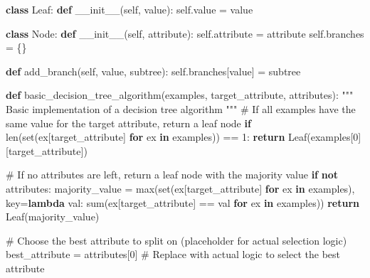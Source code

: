 \documentclass[
  letterpaper,
  DIV=11,
  numbers=noendperiod]{scrreprt}
\newenvironment{Shaded}{\begin{snugshade}}{\end{snugshade}}
\newcommand{\BuiltInTok}[1]{\textcolor[rgb]{0.00,0.23,0.31}{#1}}
\newcommand{\CommentTok}[1]{\textcolor[rgb]{0.37,0.37,0.37}{#1}}
\newcommand{\ControlFlowTok}[1]{\textcolor[rgb]{0.00,0.23,0.31}{\textbf{#1}}}
\newcommand{\DecValTok}[1]{\textcolor[rgb]{0.68,0.00,0.00}{#1}}
\newcommand{\FunctionTok}[1]{\textcolor[rgb]{0.28,0.35,0.67}{#1}}
\newcommand{\KeywordTok}[1]{\textcolor[rgb]{0.00,0.23,0.31}{\textbf{#1}}}
\newcommand{\NormalTok}[1]{\textcolor[rgb]{0.00,0.23,0.31}{#1}}
\newcommand{\OperatorTok}[1]{\textcolor[rgb]{0.37,0.37,0.37}{#1}}
\newcommand{\VariableTok}[1]{\textcolor[rgb]{0.07,0.07,0.07}{#1}}
\begin{document}
\begin{Shaded}
\begin{Highlighting}[]
\KeywordTok{class}\NormalTok{ Leaf:}
    \KeywordTok{def} \FunctionTok{\_\_init\_\_}\NormalTok{(}\VariableTok{self}\NormalTok{, value):}
        \VariableTok{self}\NormalTok{.value }\OperatorTok{=}\NormalTok{ value}

\KeywordTok{class}\NormalTok{ Node:}
    \KeywordTok{def} \FunctionTok{\_\_init\_\_}\NormalTok{(}\VariableTok{self}\NormalTok{, attribute):}
        \VariableTok{self}\NormalTok{.attribute }\OperatorTok{=}\NormalTok{ attribute}
        \VariableTok{self}\NormalTok{.branches }\OperatorTok{=}\NormalTok{ \{\}}

    \KeywordTok{def}\NormalTok{ add\_branch(}\VariableTok{self}\NormalTok{, value, subtree):}
        \VariableTok{self}\NormalTok{.branches[value] }\OperatorTok{=}\NormalTok{ subtree}

\KeywordTok{def}\NormalTok{ basic\_decision\_tree\_algorithm(examples, target\_attribute, attributes):}
    \CommentTok{"""}
\CommentTok{    Basic implementation of a decision tree algorithm}
\CommentTok{    """}
    \CommentTok{\# If all examples have the same value for the target attribute, return a leaf node}
    \ControlFlowTok{if} \BuiltInTok{len}\NormalTok{(}\BuiltInTok{set}\NormalTok{(ex[target\_attribute] }\ControlFlowTok{for}\NormalTok{ ex }\KeywordTok{in}\NormalTok{ examples)) }\OperatorTok{==} \DecValTok{1}\NormalTok{:}
        \ControlFlowTok{return}\NormalTok{ Leaf(examples[}\DecValTok{0}\NormalTok{][target\_attribute])}
    
    \CommentTok{\# If no attributes are left, return a leaf node with the majority value}
    \ControlFlowTok{if} \KeywordTok{not}\NormalTok{ attributes:}
\NormalTok{        majority\_value }\OperatorTok{=} \BuiltInTok{max}\NormalTok{(}\BuiltInTok{set}\NormalTok{(ex[target\_attribute] }\ControlFlowTok{for}\NormalTok{ ex }\KeywordTok{in}\NormalTok{ examples), key}\OperatorTok{=}\KeywordTok{lambda}\NormalTok{ val: }\BuiltInTok{sum}\NormalTok{(ex[target\_attribute] }\OperatorTok{==}\NormalTok{ val }\ControlFlowTok{for}\NormalTok{ ex }\KeywordTok{in}\NormalTok{ examples))}
        \ControlFlowTok{return}\NormalTok{ Leaf(majority\_value)}
    
    \CommentTok{\# Choose the best attribute to split on (placeholder for actual selection logic)}
\NormalTok{    best\_attribute }\OperatorTok{=}\NormalTok{ attributes[}\DecValTok{0}\NormalTok{]  }\CommentTok{\# Replace with actual logic to select the best attribute}
    

\end{Highlighting}
\end{Shaded}
\end{document}
